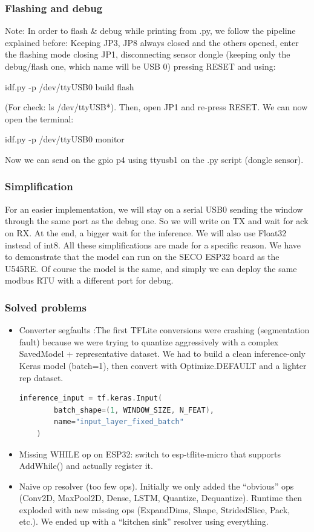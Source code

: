 \subsubsection{Flashing and debug}

Note: In order to flash \& debug while printing from .py, we follow the pipeline explained before:
Keeping JP3, JP8 always closed and the others opened, enter the flashing mode closing JP1, disconnecting sensor dongle (keeping only the debug/flash one, which name will be USB 0) pressing RESET and using:
\begin{center}
    idf.py -p /dev/ttyUSB0 build flash
\end{center}
(For check: ls /dev/ttyUSB*). Then, open JP1 and re-press RESET. We can now open the terminal:
\begin{center}
idf.py -p /dev/ttyUSB0 monitor
\end{center}
Now we can send on the gpio p4 using ttyusb1 on the .py script (dongle sensor).


\subsubsection{Simplification}

For an easier implementation, we will stay on a serial USB0 sending the window through the same port as the debug one. So we will write on TX and wait for ack on RX. At the end, a bigger wait for the inference. We will also use Float32 instead of int8. All these simplifications are made for a specific reason. We have to demonstrate that the model can run on the SECO ESP32 board as the U545RE. Of course the model is the same, and simply we can deploy the same modbus RTU with a different port for debug.

\subsubsection{Solved problems}

\begin{itemize}
\item Converter segfaults :The first TFLite conversions were crashing (segmentation fault) because we were trying to quantize aggressively with a complex SavedModel + representative dataset. We had to build a clean inference-only Keras model (batch=1), then convert with Optimize.DEFAULT and a lighter rep dataset.
\begin{lstlisting}[language=C]
    inference_input = tf.keras.Input(
        batch_shape=(1, WINDOW_SIZE, N_FEAT),
        name="input_layer_fixed_batch"
    )
\end{lstlisting}
\item Missing WHILE op on ESP32: switch to esp-tflite-micro that supports AddWhile() and actually register it.
\item Naive op resolver (too few ops). Initially we only added the “obvious” ops (Conv2D, MaxPool2D, Dense, LSTM, Quantize, Dequantize). Runtime then exploded with new missing ops (ExpandDims, Shape, StridedSlice, Pack, etc.). We ended up with a “kitchen sink” resolver using everything.
\end{itemize}

